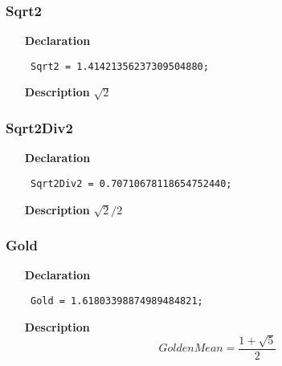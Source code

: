 \documentclass[12pt,a4paper,oneside]{report}
\newcommand{\declarationitem}[1]{\textbf{#1}}
\newcommand{\descriptiontitle}[1]{\textbf{#1}}
\newcommand{\code}[1]{\texttt{#1}}
\begin{document}
\subsubsection{Sqrt2}
\label{utypes-Sqrt2}
\begin{itemize}\item[\declarationitem{Declaration}\hfill]
	\begin{flushleft}
		\code{
			Sqrt2      = 1.41421356237309504880;}
		
	\end{flushleft}
	
	\par
	\item[\descriptiontitle{Description}]
	$\sqrt{2}$
	
\end{itemize}
\subsubsection{Sqrt2Div2}
\label{utypes-Sqrt2Div2}
\begin{itemize}\item[\declarationitem{Declaration}\hfill]
	\begin{flushleft}
		\code{
			Sqrt2Div2  = 0.70710678118654752440;}
		
	\end{flushleft}
	
	\par
	\item[\descriptiontitle{Description}]
	$\sqrt{2}/2$
	
\end{itemize}
\subsubsection{Gold}
\label{utypes-Gold}
\begin{itemize}\item[\declarationitem{Declaration}\hfill]
	\begin{flushleft}
		\code{
			Gold       = 1.61803398874989484821;}
		
	\end{flushleft}
	
	\par
	\item[\descriptiontitle{Description}]
$$
Golden Mean = \frac{1 + \sqrt{5}}{2}
$$
	
\end{itemize}
\end{document}
